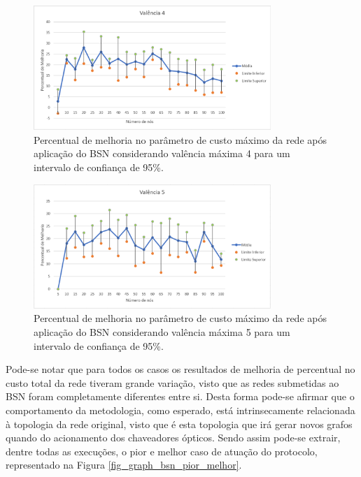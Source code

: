 \begin{figure} [ht]%
	\centering
	\includegraphics[width=0.8\textwidth]{./figuras/BSN-valencia4-5exec-grafico3.png} %
		\caption[Melhoria de custo máximo com valência 4]{Percentual de melhoria no parâmetro de custo máximo da rede após aplicação do BSN considerando valência máxima 4 para um intervalo de confiança de 95\%.}
		\label{fig_graph_bsn_val4}
\end{figure}

\begin{figure} [ht]%
	\centering
	\includegraphics[width=0.8\textwidth]{./figuras/BSN-valencia5-5exec-grafico3.png} %
	\caption[Melhoria de custo máximo com valência 5]{Percentual de melhoria no parâmetro de custo máximo da rede após aplicação do BSN considerando valência máxima 5 para um intervalo de confiança de 95\%.}
	\label{fig_graph_bsn_val5}
\end{figure}

Pode-se notar que para todos os casos os resultados de melhoria de percentual no custo total da rede tiveram grande variação, visto que as redes submetidas ao BSN foram completamente diferentes entre si. Desta forma pode-se afirmar que o comportamento da metodologia, como esperado, está intrinsecamente relacionada à topologia da rede original, visto que é esta topologia que irá gerar novos grafos quando do acionamento dos chaveadores ópticos. Sendo assim pode-se extrair, dentre todas as execuções, o pior e melhor caso de atuação do protocolo, representado na Figura \ref{fig_graph_bsn_pior_melhor}.

